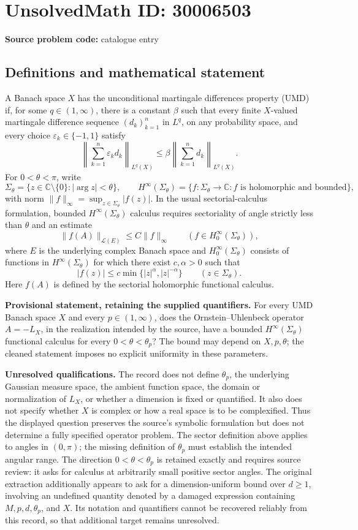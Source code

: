 \documentclass[11pt]{article}
\newcommand{\C}{\mathbb{C}}
\begin{document}
\section*{UnsolvedMath ID: 30006503}
\textbf{Source problem code:} catalogue entry
\subsection{Definitions and mathematical statement}
A Banach space \(X\) has the unconditional martingale differences property (UMD) if, for some \(q\in(1,\infty)\), there is a constant \(\beta\) such that every finite \(X\)-valued martingale difference sequence \((d_k)_{k=1}^n\) in \(L^q\), on any probability space, and every choice \(\varepsilon_k\in\{-1,1\}\) satisfy
\[
\left\|\sum_{k=1}^n\varepsilon_k d_k\right\|_{L^q(X)}
\leq \beta\left\|\sum_{k=1}^n d_k\right\|_{L^q(X)}.
\]
For \(0<\theta<\pi\), write
\[
\Sigma_\theta=\{z\in\C\setminus\{0\}:|\arg z|<\theta\},\qquad
H^\infty(\Sigma_\theta)=\{f:\Sigma_\theta\to\C:f\text{ is holomorphic and bounded}\},
\]
with norm \(\|f\|_\infty=\sup_{z\in\Sigma_\theta}|f(z)|\). In the usual sectorial-calculus formulation, bounded \(H^\infty(\Sigma_\theta)\) calculus requires sectoriality of angle strictly less than \(\theta\) and an estimate
\[
\|f(A)\|_{\mathcal L(E)}\leq C\|f\|_\infty
\qquad(f\in H_0^\infty(\Sigma_\theta)),
\]
where \(E\) is the underlying complex Banach space and \(H_0^\infty(\Sigma_\theta)\) consists of functions in \(H^\infty(\Sigma_\theta)\) for which there exist \(c,\alpha>0\) such that
\[
|f(z)|\leq c\min\{|z|^\alpha,|z|^{-\alpha}\}\qquad(z\in\Sigma_\theta).
\]
Here \(f(A)\) is defined by the sectorial holomorphic functional calculus.

\textbf{Provisional statement, retaining the supplied quantifiers.} For every UMD Banach space \(X\) and every \(p\in(1,\infty)\), does the Ornstein--Uhlenbeck operator \(A=-L_X\), in the realization intended by the source, have a bounded \(H^\infty(\Sigma_\theta)\) functional calculus for every \(0<\theta<\theta_p\)? The bound may depend on \(X,p,\theta\); the cleaned statement imposes no explicit uniformity in these parameters.

\textbf{Unresolved qualifications.} The record does not define \(\theta_p\), the underlying Gaussian measure space, the ambient function space, the domain or normalization of \(L_X\), or whether a dimension is fixed or quantified. It also does not specify whether \(X\) is complex or how a real space is to be complexified. Thus the displayed question preserves the source's symbolic formulation but does not determine a fully specified operator problem. The sector definition above applies to angles in \((0,\pi)\); the missing definition of \(\theta_p\) must establish the intended angular range. The direction \(0<\theta<\theta_p\) is retained exactly and requires source review: it asks for calculus at arbitrarily small positive sector angles. The original extraction additionally appears to ask for a dimension-uniform bound over \(d\geq1\), involving an undefined quantity denoted by a damaged expression containing \(M,p,d,\theta_p\), and \(X\). Its notation and quantifiers cannot be recovered reliably from this record, so that additional target remains unresolved.
\end{document}
